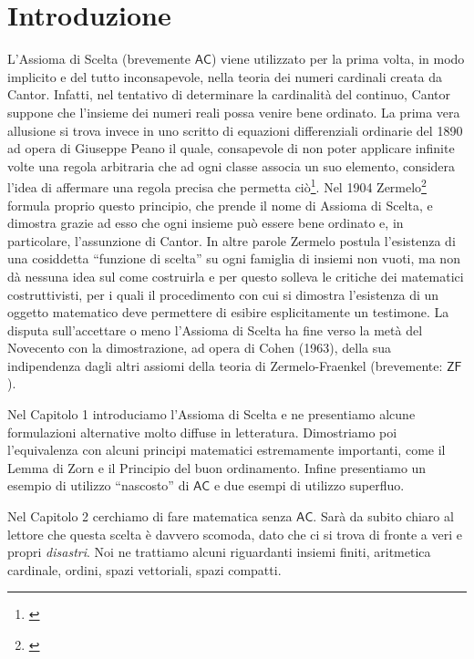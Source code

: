 \documentclass[12pt,a4paper]{report}
\theoremstyle{definition}
\theoremstyle{num.custom-title}
\newcommand{\AC}{\ensuremath{\mathsf{AC}}\xspace}
\newcommand{\ZF}{\ensuremath{\mathsf{ZF}}\xspace}
\begin{document}



\newpage

\tableofcontents


\chapter*{Introduzione} 



L'Assioma di Scelta (brevemente \AC) viene utilizzato per la prima volta, in modo implicito e del tutto inconsapevole, nella teoria dei numeri cardinali creata da Cantor. Infatti, nel tentativo di determinare la cardinalità del continuo, Cantor suppone che l'insieme dei numeri reali possa venire bene ordinato. La prima vera allusione si trova invece in uno scritto di equazioni differenziali ordinarie del 1890 ad opera di Giuseppe Peano il quale, consapevole di non poter applicare infinite volte una regola arbitraria che ad ogni classe associa un suo elemento, considera l'idea di affermare una regola precisa che permetta ciò\footnote{\cite{Pea1890:web}}. Nel 1904 Zermelo\footnote{\cite{Zer04:web}} formula proprio questo principio, che prende il nome di Assioma di Scelta, e dimostra grazie ad esso che ogni insieme può essere bene ordinato e, in particolare, l'assunzione di Cantor. In altre parole Zermelo postula l'esistenza di una cosiddetta ``funzione di scelta'' su ogni famiglia di insiemi non vuoti, ma non dà nessuna idea sul come costruirla e per questo solleva le critiche dei matematici costruttivisti, per i quali il procedimento con cui si dimostra l'esistenza di un oggetto matematico deve permettere di esibire esplicitamente un testimone. La disputa sull'accettare o meno l'Assioma di Scelta ha fine verso la metà del Novecento con la dimostrazione, ad opera di Cohen (1963), della sua indipendenza dagli altri assiomi della teoria di Zermelo-Fraenkel (brevemente: \ZF).

Nel Capitolo 1 introduciamo l'Assioma di Scelta e ne presentiamo alcune formulazioni alternative molto diffuse in letteratura. Dimostriamo poi l'equivalenza con alcuni principi matematici estremamente importanti, come il Lemma di Zorn e il Principio del buon ordinamento. Infine presentiamo un esempio di utilizzo ``nascosto'' di \AC e due esempi di utilizzo superfluo.

Nel Capitolo 2 cerchiamo di fare matematica senza \AC. Sarà da subito chiaro al lettore che questa scelta è davvero scomoda, dato che ci si trova di fronte a veri e propri \emph{disastri}. Noi ne trattiamo alcuni riguardanti insiemi finiti, aritmetica cardinale, ordini, spazi vettoriali, spazi compatti.
\end{document}
